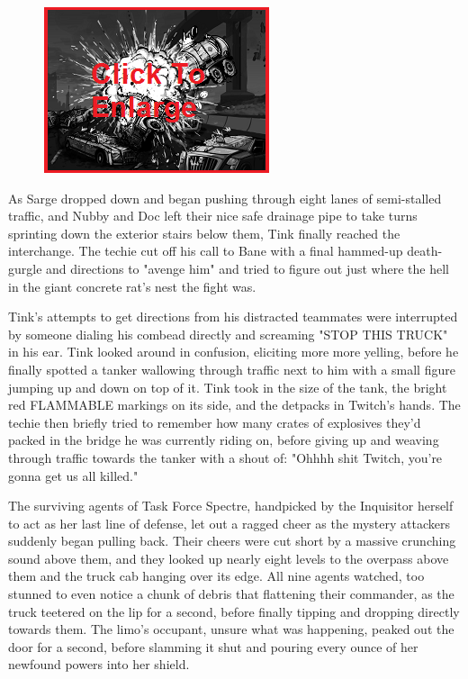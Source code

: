 \begin{figure}
	\begin{center}
		\includegraphics[width=\figwidth]{pics/19/42.png}
	\end{center}
\end{figure}
As Sarge dropped down and began pushing through eight lanes of semi-stalled traffic, and Nubby and Doc left their nice safe drainage pipe to take turns sprinting down the exterior stairs below them, Tink finally reached the interchange. 
The techie cut off his call to Bane with a final hammed-up death-gurgle and directions to "avenge him" and tried to figure out just where the hell in the giant concrete rat's nest the fight was. 


Tink's attempts to get directions from his distracted teammates were interrupted by someone dialing his combead directly and screaming "STOP THIS TRUCK" in his ear. 
Tink looked around in confusion, eliciting more more yelling, before he finally spotted a tanker wallowing through traffic next to him with a small figure jumping up and down on top of it. 
Tink took in the size of the tank, the bright red FLAMMABLE markings on its side, and the detpacks in Twitch's hands. 
The techie then briefly tried to remember how many crates of explosives they'd packed in the bridge he was currently riding on, before giving up and weaving through traffic towards the tanker with a shout of: 
"Ohhhh shit Twitch, you're gonna get us all killed."

The surviving agents of Task Force Spectre, handpicked by the Inquisitor herself to act as her last line of defense, let out a ragged cheer as the mystery attackers suddenly began pulling back. 
Their cheers were cut short by a massive crunching sound above them, and they looked up nearly eight levels to the overpass above them and the truck cab hanging over its edge. 
All nine agents watched, too stunned to even notice a chunk of debris that flattening their commander, as the truck teetered on the lip for a second, before finally tipping and dropping directly towards them. 
The limo's occupant, unsure what was happening, peaked out the door for a second, before slamming it shut and pouring every ounce of her newfound powers into her shield.

